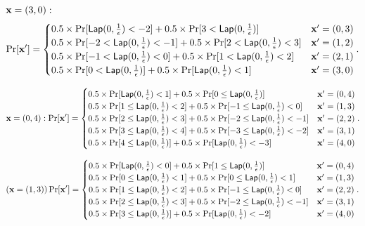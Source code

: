 \documentclass{article}
\begin{document}
{{\noindent $\textbf{x} = (3,0):$
\[
\Pr[\dataobs']
= \begin{cases}
 	0.5 \times 
 	\Pr[	\lap{0}{\frac{1}{\epsilon}}	<	-2] 
 	+ 	
 	0.5 \times 
 	\Pr[	3	< \lap{0}{\frac{1}{\epsilon}}] 
	& \dataobs' = (0, 3)\\
%
 	0.5 \times 
 	\Pr[	-2	< \lap{0}{\frac{1}{\epsilon}}	<	-1] 
 	+ 	
 	0.5 \times 
 	\Pr[	2	< \lap{0}{\frac{1}{\epsilon}}	<	3] 
	& \dataobs' = (1, 2)\\
%
 	0.5 \times 
 	\Pr[	-1	<	\lap{0}{\frac{1}{\epsilon}}	<	0] 
 	+ 	
 	0.5 \times 
 	\Pr[	1	< \lap{0}{\frac{1}{\epsilon}}	<	2] 
	& \dataobs' = (2, 1)\\
%
 	0.5 \times 
 	\Pr[	0	<	\lap{0}{\frac{1}{\epsilon}}	] 
 	+ 	
 	0.5 \times 
 	\Pr[	\lap{0}{\frac{1}{\epsilon}}	<	1] 
	& \dataobs' = (3, 0)
\end{cases}.
\]
}


{\scriptsize

\[
\dataobs = (0,4): \Pr[\dataobs']
= \begin{cases}
	0.5 \times 
 	\Pr[	\lap{0}{\frac{1}{\epsilon}}	<	1] 
 	+ 	
 	0.5 \times 
 	\Pr[	0	\leq \lap{0}{\frac{1}{\epsilon}}] 
%
	& \dataobs' = (0, 4)\\
%
 	0.5 \times 
 	\Pr[	1	\leq \lap{0}{\frac{1}{\epsilon}}	<	2] 
 	+ 	
 	0.5 \times 
 	\Pr[	-1	\leq \lap{0}{\frac{1}{\epsilon}}	<	0] 
%
	& \dataobs' = (1, 3)\\
%
 	0.5 \times 
 	\Pr[	2	\leq	\lap{0}{\frac{1}{\epsilon}}	<	3] 
 	+ 	
 	0.5 \times 
 	\Pr[	-2	\leq \lap{0}{\frac{1}{\epsilon}}	<	-1] 
%
	& \dataobs' = (2, 2)\\
%
 	0.5 \times 
 	\Pr[	3	\leq	\lap{0}{\frac{1}{\epsilon}}	< 4]
 	+ 	
 	0.5 \times 
 	\Pr[	-3	\leq	\lap{0}{\frac{1}{\epsilon}}	<	-2] 
%
	& \dataobs' = (3, 1)\\
%
 	0.5 \times 
 	\Pr[	4	\leq	\lap{0}{\frac{1}{\epsilon}}]
 	+ 	
 	0.5 \times 
 	\Pr[	\lap{0}{\frac{1}{\epsilon}}	<	-3] 
%
	& \dataobs' = (4, 0)
\end{cases}.
\]

\[
(\dataobs = (1,3)) \Pr[\dataobs']
= \begin{cases}
 	0.5 \times 
 	\Pr[	\lap{0}{\frac{1}{\epsilon}}	<	0] 
 	+ 	
 	0.5 \times 
 	\Pr[	1	\leq \lap{0}{\frac{1}{\epsilon}}] 
	& \dataobs' = (0, 4)\\
%
 	0.5 \times 
 	\Pr[	0	\leq \lap{0}{\frac{1}{\epsilon}}	<	1] 
 	+ 	
 	0.5 \times 
 	\Pr[	0	\leq \lap{0}{\frac{1}{\epsilon}}	<	1] 
	& \dataobs' = (1, 3)\\
%
 	0.5 \times 
 	\Pr[	1	\leq	\lap{0}{\frac{1}{\epsilon}}	<	2] 
 	+ 	
 	0.5 \times 
 	\Pr[	-1	\leq \lap{0}{\frac{1}{\epsilon}}	<	0] 
	& \dataobs' = (2, 2)\\
%
 	0.5 \times 
 	\Pr[	2	\leq	\lap{0}{\frac{1}{\epsilon}}	<	3] 
 	+ 	
 	0.5 \times 
 	\Pr[	-2	\leq	\lap{0}{\frac{1}{\epsilon}}	<	-1] 
	& \dataobs' = (3, 1)\\
 	0.5 \times 
 	\Pr[	3	\leq	\lap{0}{\frac{1}{\epsilon}}] 
 	+ 	
 	0.5 \times 
 	\Pr[	\lap{0}{\frac{1}{\epsilon}}	<	-2] 
	& \dataobs' = (4, 0)
\end{cases}.
\]



}}
\end{document}
